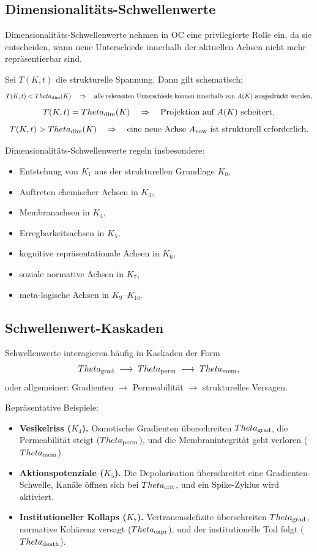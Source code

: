 \subsection{Dimensionalitäts-Schwellenwerte}

Dimensionalitäts-Schwellenwerte nehmen in OC eine privilegierte Rolle ein, da sie
entscheiden, wann neue Unterschiede innerhalb der aktuellen Achsen nicht mehr
repräsentierbar sind.

Sei \(T(K,t)\) die strukturelle Spannung.
Dann gilt schematisch:
\[
  T(K,t) < \Theta_{\rm dim}(K)
   \quad\Rightarrow\quad
   \text{alle relevanten Unterschiede können innerhalb von } A(K) \text{ ausgedrückt werden},
\]
\[
  T(K,t) = \Theta_{\rm dim}(K)
   \quad\Rightarrow\quad
   \text{Projektion auf } A(K)\ \text{scheitert},
\]
\[
  T(K,t) > \Theta_{\rm dim}(K)
   \quad\Rightarrow\quad
   \text{eine neue Achse } A_{\rm new} \text{ ist strukturell erforderlich}.
\]

Dimensionalitäts-Schwellenwerte regeln insbesondere:
\begin{itemize}
    \item Entstehung von \(K_1\) aus der strukturellen Grundlage \(K_0\),
    \item Auftreten chemischer Achsen in \(K_3\),
    \item Membranachsen in \(K_4\),
    \item Erregbarkeitsachsen in \(K_5\),
    \item kognitive repräsentationale Achsen in \(K_6\),
    \item soziale normative Achsen in \(K_7\),
    \item meta-logische Achsen in \(K_9\)–\(K_{10}\).
\end{itemize}

\subsection{Schwellenwert-Kaskaden}

Schwellenwerte interagieren häufig in Kaskaden der Form
\[
  \Theta_{\rm grad}
  \;\longrightarrow\;
  \Theta_{\rm perm}
  \;\longrightarrow\;
  \Theta_{\rm mem},
\]
oder allgemeiner: Gradienten \(\to\) Permeabilität \(\to\) strukturelles Versagen.

Repräsentative Beispiele:

\begin{itemize}
    \item \textbf{Vesikelriss (\(K_4\)).}
          Osmotische Gradienten überschreiten \(\Theta_{\rm grad}\), die Permeabilität steigt
          (\(\Theta_{\rm perm}\)), und die Membranintegrität geht verloren
          (\(\Theta_{\rm mem}\)).
    \item \textbf{Aktionspotenziale (\(K_5\)).}
          Die Depolarisation überschreitet eine Gradienten-Schwelle, Kanäle öffnen sich bei
          \(\Theta_{\rm crit}\), und ein Spike-Zyklus wird aktiviert.
    \item \textbf{Institutioneller Kollaps (\(K_7\)).}
          Vertrauensdefizite überschreiten \(\Theta_{\rm grad}\), normative Kohärenz
          versagt (\(\Theta_{\rm expr}\)), und der institutionelle Tod folgt
          (\(\Theta_{\rm death}\)).
\end{itemize}

